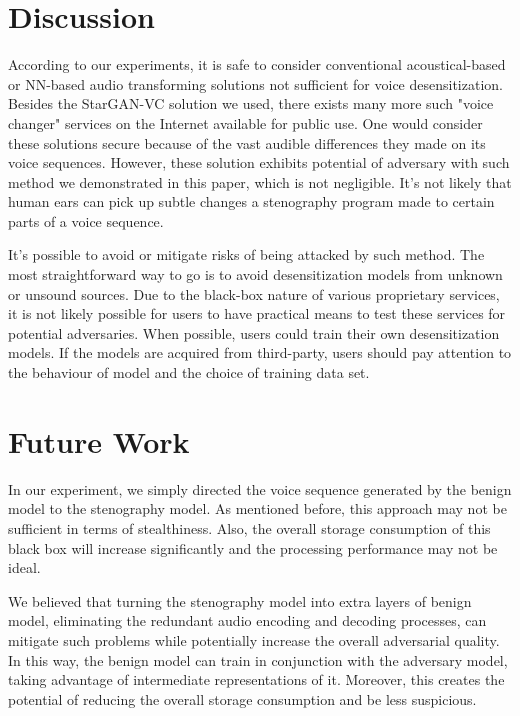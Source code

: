 \documentclass[journal]{IEEEtran} %
\begin{document}
\begin{CJK*}{UTF8}{gbsn}
\section{Discussion}

According to our experiments, it is safe to consider conventional acoustical-based or NN-based audio transforming solutions not sufficient for voice desensitization. Besides the StarGAN-VC solution we used, there exists many more such "voice changer" services on the Internet available for public use. One would consider these solutions secure because of the vast audible differences they made on its voice sequences. However, these solution exhibits potential of adversary with such method we demonstrated in this paper, which is not negligible. It's not likely that human ears can pick up subtle changes a stenography program made to certain parts of a voice sequence.

It's possible to avoid or mitigate risks of being attacked by such method. The most straightforward way to go is to avoid desensitization models from unknown or unsound sources. Due to the black-box nature of various proprietary services, it is not likely possible for users to have practical means to test these services for potential adversaries. When possible, users could train their own desensitization models. If the models are acquired from third-party, users should pay attention to the behaviour of model and the choice of training data set.

\section{Future Work}

In our experiment, we simply directed the voice sequence generated by the benign model to the stenography model. As mentioned before, this approach may not be sufficient in terms of stealthiness. Also, the overall storage consumption of this black box will increase significantly and the processing performance may not be ideal.

We believed that turning the stenography model into extra layers of benign model, eliminating the redundant audio encoding and decoding processes, can mitigate such problems while potentially increase the overall adversarial quality. In this way, the benign model can train in conjunction with the adversary model, taking advantage of intermediate representations of it. Moreover, this creates the potential of reducing the overall storage consumption and be less suspicious.


\end{CJK*}
\end{document}

